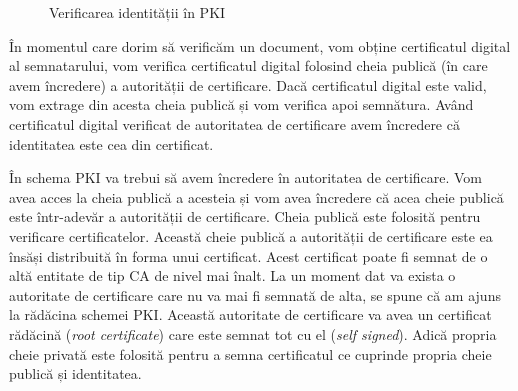 \begin{figure}[htbp]
  \centering
  \begin{subfigure}[b]{0.48\textwidth}
    \centering
    \def\svgwidth{\columnwidth}
    
  \end{subfigure}
  \begin{subfigure}[b]{0.48\textwidth}
    \centering
    \def\svgwidth{\columnwidth}
    
  \end{subfigure}
  \begin{subfigure}[b]{0.48\textwidth}
    \centering
    \def\svgwidth{\columnwidth}
    
  \end{subfigure}
  \begin{subfigure}[b]{0.48\textwidth}
    \centering
    \def\svgwidth{\columnwidth}
    
  \end{subfigure}
  \begin{subfigure}[b]{0.48\textwidth}
    \centering
    \def\svgwidth{\columnwidth}
    
  \end{subfigure}
  \caption{Verificarea identității în PKI}
  \label{fig:sec:pki}
\end{figure}

În momentul care dorim să verificăm un document, vom obține certificatul digital al semnatarului, vom verifica certificatul digital folosind cheia publică (în care avem încredere) a autorității de certificare.
Dacă certificatul digital este valid, vom extrage din acesta cheia publică și vom verifica apoi semnătura.
Având certificatul digital verificat de autoritatea de certificare avem încredere că identitatea este cea din certificat.

În schema PKI va trebui să avem încredere în autoritatea de certificare.
Vom avea acces la cheia publică a acesteia și vom avea încredere că acea cheie publică este într-adevăr a autorității de certificare.
Cheia publică este folosită pentru verificare certificatelor.
Această cheie publică a autorității de certificare este ea însăși distribuită în forma unui certificat.
Acest certificat poate fi semnat de o altă entitate de tip CA de nivel mai înalt.
La un moment dat va exista o autoritate de certificare care nu va mai fi semnată de alta, se spune că am ajuns la rădăcina schemei PKI.
Această autoritate de certificare va avea un certificat rădăcină (\textit{root certificate}) care este semnat tot cu el (\textit{self signed}).
Adică propria cheie privată este folosită pentru a semna certificatul ce cuprinde propria cheie publică și identitatea.

